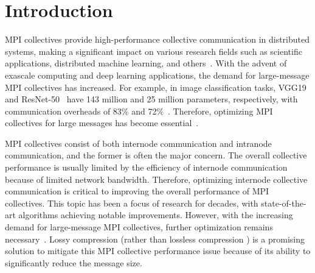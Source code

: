 
\section{Introduction}
MPI collectives provide high-performance collective communication in distributed systems, making a significant impact on various research fields such as scientific applications, distributed machine learning, and others~\cite{awan2017s, wang2006pelegant, abadi2016tensorflow, ayala2019impacts, jain2019scaling, abdelmoniem2021efficient}. With the advent of exascale computing and deep learning applications, the demand for large-message MPI collectives has increased. For example, in image classification tasks, VGG19~\cite{simonyan2015very} and ResNet-50~\cite{he2016deep} have 143 million and 25 million parameters, respectively, with communication overheads of 83\% and 72\%~\cite{abdelmoniem2021efficient}. Therefore, optimizing MPI collectives for large messages has become essential~\cite{chunduri2018characterization, Bayatpour2018SALaR, patarasuk2009bandwidth}.


MPI collectives consist of both internode communication and intranode communication, and the former is often the major concern. The overall collective performance is usually limited by the efficiency of internode communication because of limited network bandwidth. Therefore, optimizing internode collective communication is critical to improving the overall performance of MPI collectives. This topic has been a focus of research for decades, with state-of-the-art algorithms achieving notable improvements. However, with the increasing demand for large-message MPI collectives, further optimization remains necessary~\cite{Alm05BlueGene, thakur2005optimization, patarasuk2009bandwidth}. Lossy compression \cite{Di2016SZ,Tao2017SZ,Zhao2020SZauto,Lindstrom2014ZFP} (rather than lossless compression \cite{Deutsch1996gzip, Gaillyzlib,Collet2015zstd}) is a promising solution to mitigate this MPI collective performance issue because of its ability to significantly reduce the message size.




